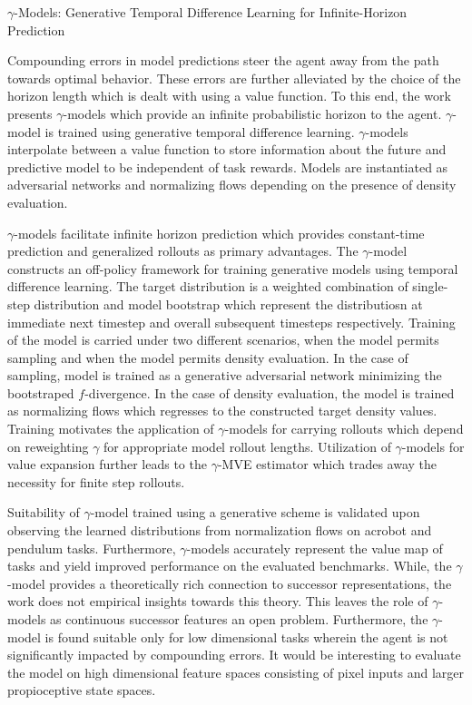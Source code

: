 \documentclass[11pt,letterpaper]{article}
\begin{document}
\begin{center}
  \large{$\gamma$-Models: Generative Temporal Difference Learning for Infinite-Horizon Prediction}
\end{center}
 Compounding errors in model predictions steer the agent away from the path towards optimal behavior. These errors are further alleviated by the choice of the horizon length which is dealt with using a value function. To this end, the work presents $\gamma$-models which provide an infinite probabilistic horizon to the agent. $\gamma$-model is trained using generative temporal difference learning. $\gamma$-models interpolate between a value function to store information about the future and predictive model to be independent of task rewards. Models are instantiated as adversarial networks and normalizing flows depending on the presence of density evaluation. 

 $\gamma$-models facilitate infinite horizon prediction which provides constant-time prediction and generalized rollouts as primary advantages. The $\gamma$-model constructs an off-policy framework for training generative models using temporal difference learning. The target distribution is a weighted combination of single-step distribution and model bootstrap which represent the distributiosn at immediate next timestep and overall subsequent timesteps respectively. Training of the model is carried under two different scenarios, when the model permits sampling and when the model permits density evaluation. In the case of sampling, model is trained as a generative adversarial network minimizing the bootstraped $f$-divergence. In the case of density evaluation, the model is trained as normalizing flows which regresses to the constructed target density values. Training motivates the application of $\gamma$-models for carrying rollouts which depend on reweighting $\gamma$ for appropriate model rollout lengths. Utilization of $\gamma$-models for value expansion further leads to the $\gamma$-MVE estimator which trades away the necessity for finite step rollouts. 

Suitability of $\gamma$-model trained using a generative scheme is validated upon observing the learned distributions from normalization flows on acrobot and pendulum tasks. Furthermore, $\gamma$-models accurately represent the value map of tasks and yield improved performance on the evaluated benchmarks. While, the $\gamma$-model provides a theoretically rich connection to successor representations, the work does not empirical insights towards this theory. This leaves the role of $\gamma$-models as continuous successor features an open problem. Furthermore, the $\gamma$-model is found suitable only for low dimensional tasks wherein the agent is not significantly impacted by compounding errors. It would be interesting to evaluate the model on high dimensional feature spaces consisting of pixel inputs and larger propioceptive state spaces. 
\end{document}
